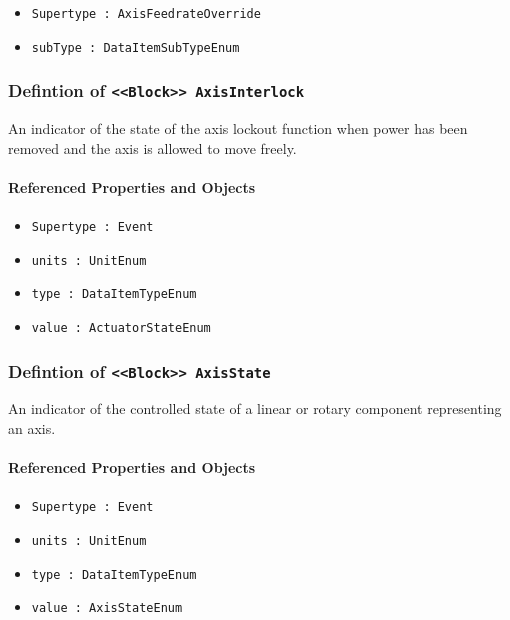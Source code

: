\begin{itemize}
\item \texttt{Supertype : AxisFeedrateOverride}

\item \texttt{subType : DataItemSubTypeEnum}

\end{itemize}
\FloatBarrier
\subsubsection{Defintion of \texttt{<<Block>> AxisInterlock}}
  \label{type:AxisInterlock}

\FloatBarrier

An indicator of the state of the axis lockout function when power has been removed and the axis is allowed to move freely.

\FloatBarrier
\paragraph{Referenced Properties and Objects}

\begin{itemize}
\item \texttt{Supertype : Event}

\item \texttt{units : UnitEnum}

\item \texttt{type : DataItemTypeEnum}

\item \texttt{value : ActuatorStateEnum}

\end{itemize}
\FloatBarrier
\subsubsection{Defintion of \texttt{<<Block>> AxisState}}
  \label{type:AxisState}

\FloatBarrier

An indicator of the controlled state of a linear or rotary component representing an axis.

\FloatBarrier
\paragraph{Referenced Properties and Objects}

\begin{itemize}
\item \texttt{Supertype : Event}

\item \texttt{units : UnitEnum}

\item \texttt{type : DataItemTypeEnum}

\item \texttt{value : AxisStateEnum}

\end{itemize}
\FloatBarrier
